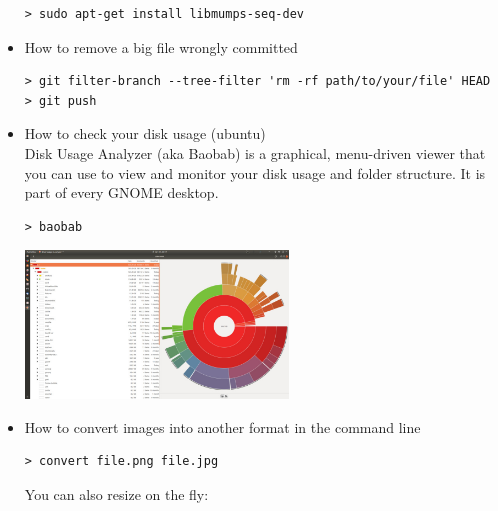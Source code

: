 \begin{itemize}
\begin{mdframed}[backgroundcolor=gray!10]
\begin{verbatim}
> sudo apt-get install libmumps-seq-dev
\end{verbatim}
\end{mdframed}

\item How to remove a big file wrongly committed

\begin{mdframed}[backgroundcolor=gray!10]
\begin{verbatim}
> git filter-branch --tree-filter 'rm -rf path/to/your/file' HEAD
> git push
\end{verbatim}
\end{mdframed}

\item How to check your disk usage (ubuntu)\\

Disk Usage Analyzer (aka Baobab) is a graphical, menu-driven viewer 
that you can use to view and monitor your disk usage and folder structure. 
It is part of every GNOME desktop.

\begin{mdframed}[backgroundcolor=gray!10]
\begin{verbatim}
> baobab
\end{verbatim}
\end{mdframed}

\begin{center}
\includegraphics[width=7cm]{images/baobab}
\end{center}


\item How to convert images into another format in the command line

\begin{mdframed}[backgroundcolor=gray!10]
\begin{verbatim}
> convert file.png file.jpg
\end{verbatim}
\end{mdframed}

You can also resize on the fly:


\end{itemize}

